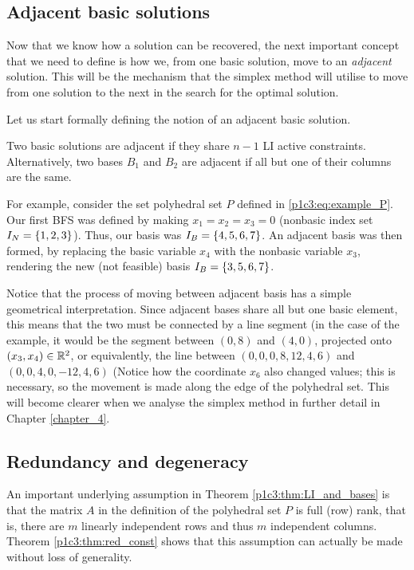\subsection{Adjacent basic solutions}

Now that we know how a solution can be recovered, the next important concept that we need to define is how we, from one basic solution, move to an \emph{adjacent} solution. This will be the mechanism that the simplex method will utilise to move from one solution to the next in the search for the optimal solution.

Let us start formally defining the notion of an adjacent basic solution.
%
\begin{definition}
	Two basic solutions are adjacent if they share $n-1$ LI active constraints. Alternatively, two bases $B_1$ and $B_2$ are adjacent if all but one of their columns are the same.
\end{definition}
%
For example, consider the set polyhedral set $P$ defined in \eqref{p1c3:eq:example_P}. Our first BFS was defined by making $x_1 = x_2 = x_3 = 0$ (nonbasic index set $I_N = \left\{ 1,2,3 \right \}$). Thus, our basis was $I_B = \left\{ 4,5,6,7 \right \}$. An adjacent basis was then formed, by replacing the basic variable $x_4$ with the nonbasic variable $x_3$, rendering the new (not feasible) basis $I_B = \left\{ 3,5,6,7 \right \}$.

Notice that the process of moving between adjacent basis has a simple geometrical interpretation. Since adjacent bases share all but one basic element, this means that the two must be connected by a line segment (in the case of the example, it would be the segment between $(0,8)$ and $(4,0)$, projected onto $(x_3,x_4) \in \mathbb{R}^2$, or equivalently, the line between $(0,0,0,8,12,4,6)$ and $(0,0,4,0,-12,4,6)$ (Notice how the coordinate $x_6$ also changed values; this is necessary, so the movement is made along the edge of the polyhedral set. This will become clearer when we analyse the simplex method in further detail in Chapter \ref{chapter_4}. 



\subsection{Redundancy and degeneracy}

An important underlying assumption in Theorem \ref{p1c3:thm:LI_and_bases} is that the matrix $A$ in the definition of the polyhedral set $P$ is full (row) rank, that is, there are $m$ linearly independent rows and thus $m$ independent columns. Theorem \ref{p1c3:thm:red_const} shows that this assumption can actually be made without loss of generality. 
 
